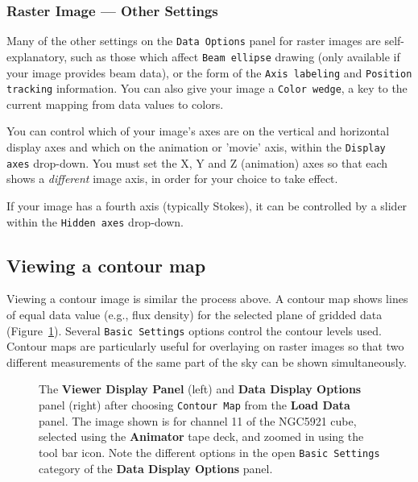 \subsubsection{Raster Image --- Other Settings}
\label{section:display.image.raster.adjust.other}

Many of the other settings on the {\tt Data Options} panel for raster images
are self-explanatory, such as those which affect {\tt Beam ellipse} drawing
(only available if your image provides beam data), or the form of the
{\tt Axis labeling} and {\tt Position tracking} information.  You can also
give your image a {\tt Color wedge}, a key to the current mapping from data
values to colors.

You can control which of your image's axes are on the vertical and horizontal
display axes and which on the animation or 'movie' axis, within the
{\tt Display axes} drop-down.  You must set the X, Y and Z (animation) axes
so that each shows a {\it different} image axis, in order for your choice
to take effect.

If your image has a fourth axis (typically Stokes), it can be controlled
by a slider within the {\tt Hidden axes} drop-down.



\subsection{Viewing a contour map}
\label{section:display.image.contour}

Viewing a contour image is similar the process above. A contour map
shows lines of equal data value (e.g., flux density) for the
selected plane of gridded data (Figure~\ref{fig:viewer_con}).
Several {\tt Basic Settings} options control the contour levels used.
Contour maps are particularly useful for overlaying on raster images so
that two different measurements of the same part of the sky can be shown
simultaneously.

 
\begin{figure}[h!]
\begin{center}
\caption{\label{fig:viewer_con} The {\bf Viewer Display Panel}
(left) and {\bf Data Display Options} panel (right) after choosing
{\tt Contour Map} from the {\bf Load Data} panel.  The
image shown is for channel 11 of the NGC5921 cube, selected using
the {\bf Animator} tape deck, and zoomed in using the tool bar icon.
Note the different options in the open {\tt Basic Settings} category
of the {\bf Data Display Options} panel.} 
\hrulefill
\end{center}
\end{figure}

